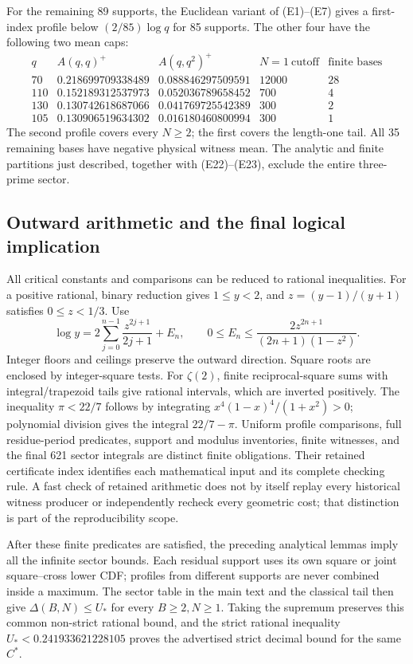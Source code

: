 \documentclass[11pt]{article}
\theoremstyle{definition}\newtheorem{definition}[theorem]{Definition}
\theoremstyle{remark}\newtheorem{remark}[theorem]{Remark}
\begin{document}
For the remaining 89 supports, the Euclidean variant of (E1)--(E7)
gives a first-index profile below \((2/85)\log q\) for 85 supports.
The other four have the following two mean caps:
\[
\begin{array}{c|cc|r|r}
 q&A(q,q)^+&A(q,q^2)^+&N=1\ \text{cutoff}&\text{finite bases}\\\hline
70&0.218699709338489&0.088846297509591&12000&28\\
110&0.152189312537973&0.052036789658452&700&4\\
130&0.130742618687066&0.041769725542389&300&2\\
105&0.130906519634302&0.016180460800994&300&1
\end{array}                                                        \tag{E30}
\]
The second profile covers every \(N\ge2\); the first covers the
length-one tail. All 35 remaining bases have negative physical
witness mean. The analytic and finite partitions just described,
together with (E22)--(E23), exclude the entire three-prime sector.

\subsection{Outward arithmetic and the final logical implication}
All critical constants and comparisons can be reduced to rational
inequalities. For a positive rational, binary reduction gives
\(1\le y<2\), and \(z=(y-1)/(y+1)\) satisfies \(0\le z<1/3\).
Use
\[
 \log y=2\sum_{j=0}^{n-1}\frac{z^{2j+1}}{2j+1}+E_n,\qquad
 0\le E_n\le\frac{2z^{2n+1}}{(2n+1)(1-z^2)} .                     \tag{E31}
\]
Integer floors and ceilings preserve the outward direction. Square
roots are enclosed by integer-square tests. For \(\zeta(2)\), finite
reciprocal-square sums with integral/trapezoid tails give rational
intervals, which are inverted positively. The inequality \(\pi<22/7\)
follows by integrating \(x^4(1-x)^4/(1+x^2)>0\); polynomial division
gives the integral \(22/7-\pi\).
Uniform profile comparisons, full residue-period predicates, support
and modulus inventories, finite witnesses, and the final 621 sector
integrals are distinct finite obligations. Their retained certificate
index identifies each mathematical input and its complete checking
rule. A fast check of retained arithmetic does not by itself replay
every historical witness producer or independently recheck every
geometric cost; that distinction is part of the reproducibility scope.

After these finite predicates are satisfied, the preceding analytical
lemmas imply all the infinite sector bounds. Each residual support
uses its own square or joint square--cross lower CDF; profiles from
different supports are never combined inside a maximum.
The sector table in the main text and the classical tail then give
\(\Delta(B,N)\le U_*\) for every \(B\ge2,N\ge1\).
Taking the supremum preserves this common non-strict rational bound,
and the strict rational inequality \(U_*<0.241933621228105\) proves
the advertised strict decimal bound for the same \(C^*\).
\end{document}
